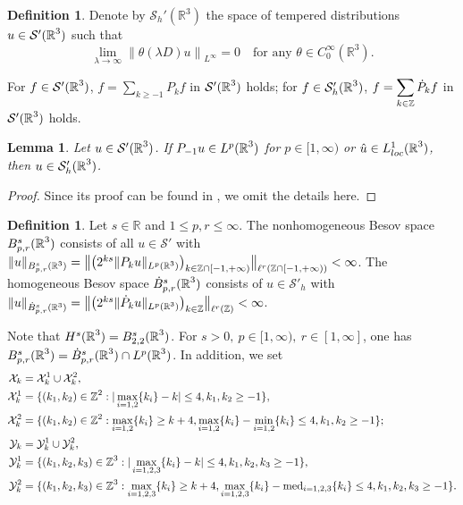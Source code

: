 \documentclass[11pt,twoside]{article}
\def\cX{\mathcal X}
\def\cY{\mathcal Y}
\def\Z{\mathop{\mathbb Z\kern 0pt}\nolimits}
\def\R{\mathop{\mathbb R\kern 0pt}\nolimits}
\def\ds{\displaystyle}
\newcommand{\pk}{\dot{P}_k}
\theoremstyle{plain}
\newtheorem{lemma}[theorem]{Lemma}
\theoremstyle{definition}
\newtheorem{definition}[theorem]{Definition}
\numberwithin{equation}{section}
\begin{document}
	\begin{definition}
		Denote by $\mathcal{S}_h'(\mathbb{R}^3)$ the space of tempered distributions $u\in\mathcal{S}'(\R^3)$ such that
		\[
		\lim_{\lambda \to \infty} \left\| \theta(\lambda D) u \right\|_{L^\infty} = 0 \quad \text{for any } \theta\in  C_0^{\infty}(\mathbb{R}^3).
		\]
	\end{definition}
For $f\in\mathcal{S}'(\R^3)$, $f=\ds\sum_{k\ge-1}P_kf$ in $\mathcal{S}'(\R^3)$ holds;
for $f\in\mathcal{S}'_h(\R^3)$, $f=\ds\sum_{k\in\Z}\pk f$ in $\mathcal{S}'(\R^3)$ holds.
	\begin{lemma}
		Let $u \in \mathcal{S}'(\R^3)$. If $P_{-1}u\in L^p(\R^3)$ for $p\in[1,\infty)$ or $\hat{u}\in L^1_{loc}(\R^3)$, then $u \in \mathcal{S}'_h(\R^3)$.
	\end{lemma}
	\begin{proof}
	Since its proof can be found in \cite[Chapter 1]{Chemin}, we omit the details here.
	\end{proof}
\begin{definition}
Let \( s \in \mathbb{R} \) and \( 1 \leq p, r \leq \infty \). The nonhomogeneous Besov space \( B^s_{p,r}(\R^3) \) consists of all  \( u\in \mathcal{S}' \) with $\|u\|_{B^s_{p,r}(\R^3)}= \big\| \big( 2^{ks} \|P_k u\|_{L^p(\R^3)} \big)_{k \in \mathbb{Z}\cap[- 1,+\infty)} \big\|_{\ell^r(\mathbb{Z}\cap[- 1,+\infty))} < \infty$.  The homogeneous Besov space \( \dot{B}^s_{p,r}(\R^3)\) consists of \( u\in \mathcal{S}'_h \) with $\|u\|_{\dot{B}^s_{p,r}(\R^3)}= \big\|\big( 2^{ks} \|\pk  u\|_{L^p(\R^3)}\big)_{k \in \mathbb{Z}}\big\|_{\ell^r(\mathbb{Z})}<\infty$.
\end{definition}
Note that $H^s(\R^3)=B^s_{2,2}(\R^3)$. For $s>0,\ p\in[1,\infty),\ r\in[1,\infty]$, one has $B^s_{p,r}(\R^3) = \dot{B}^s_{p,r}(\R^3)\cap L^p(\R^3)$.
In addition, we set
	\begin{equation*}
		\begin{split}
			\cX_k&=\cX_k^1\cup\cX_k^2,\\
			\cX_k^1&=\{(k_1,k_2)\in\Z^2: |\max_{i=1,2}\{k_i\}-k|\le4,k_1,k_2\ge-1\},\\
			\cX_k^2&=\{(k_1,k_2)\in\Z^2: \max_{i=1,2}\{k_i\}\ge k+4,
			\max_{i=1,2}\{k_i\}-\min_{i=1,2}\{k_i\}\le4,k_1,k_2\ge-1\};\\
					\cY_k&=\cY_k^1\cup\cY_k^2,\\
			\cY_k^1&=\{(k_1,k_2,k_3)\in\Z^3: |\max_{i=1,2,3}\{k_i\}-k|\le4,k_1,k_2,k_3\ge-1\},\\
			\cY_k^2&=\{(k_1,k_2,k_3)\in\Z^3: \max_{i=1,2,3}\{k_i\}\ge k+4,
			\max_{i=1,2,3}\{k_i\}-{\rm med}_{i=1,2,3}\{k_i\}\le4,k_1,k_2,k_3\ge-1\}.
		\end{split}
	\end{equation*}
\end{document}
